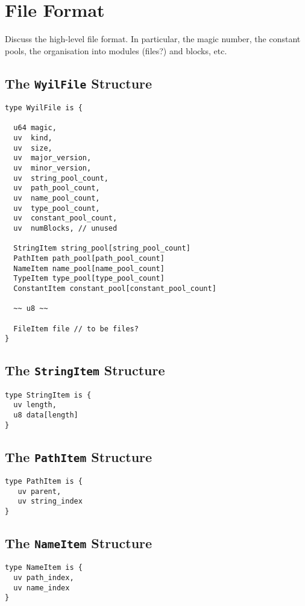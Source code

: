 \chapter{File Format}
Discuss the high-level file format.  In particular, the magic number, the constant pools, the organisation into modules (files?) and blocks, etc.

\section{The {\tt WyilFile} Structure}

\begin{lstlisting}
type WyilFile is {

  u64 magic,
  uv  kind,
  uv  size,
  uv  major_version,
  uv  minor_version,
  uv  string_pool_count,
  uv  path_pool_count,
  uv  name_pool_count,
  uv  type_pool_count,
  uv  constant_pool_count,
  uv  numBlocks, // unused

  StringItem string_pool[string_pool_count]
  PathItem path_pool[path_pool_count]
  NameItem name_pool[name_pool_count]
  TypeItem type_pool[type_pool_count]
  ConstantItem constant_pool[constant_pool_count]

  ~~ u8 ~~

  FileItem file // to be files?
}
\end{lstlisting}

\section{The {\tt StringItem} Structure}

\begin{lstlisting}
type StringItem is {
  uv length,
  u8 data[length]
}
\end{lstlisting}


\section{The {\tt PathItem} Structure}

\begin{lstlisting}
type PathItem is {
   uv parent,
   uv string_index
}
\end{lstlisting}


\section{The {\tt NameItem} Structure}

\begin{lstlisting}
type NameItem is {
  uv path_index,
  uv name_index
}
\end{lstlisting}


